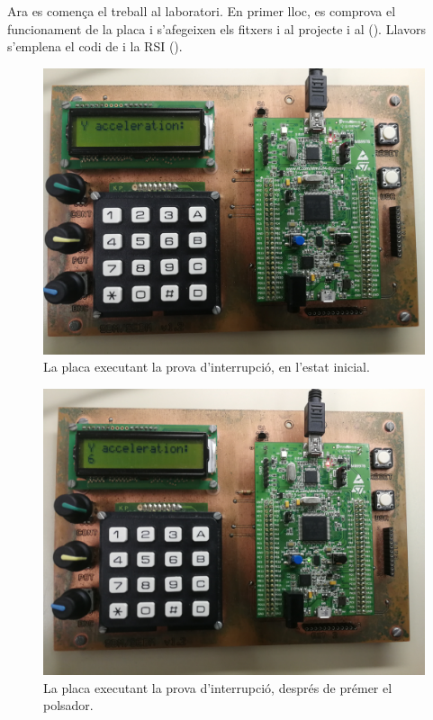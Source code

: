 Ara es comença el treball al laboratori. En primer lloc, es comprova el funcionament
de la placa i s'afegeixen els fitxers  i  al projecte
i al  ().
Llavors s'emplena el codi de  i la RSI ().

\begin{figure}[p] %
  \includegraphics[width=.82\columnwidth]{../photos/board/p4-interrupt-initial}
  \caption{ \label{fig:p4-board-initial} La placa executant la prova d'interrupció, en l'estat inicial. }
\end{figure}
\begin{figure}[p]
  \includegraphics[width=.82\columnwidth]{../photos/board/p4-interrupt-use}
  \caption{ \label{fig:p4-board-use} La placa executant la prova d'interrupció, després de prémer el polsador. }
\end{figure}

